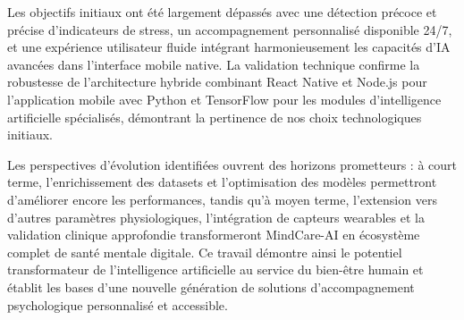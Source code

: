 Les objectifs initiaux ont été largement dépassés avec une détection précoce et précise d'indicateurs de stress, un accompagnement personnalisé disponible 24/7, et une expérience utilisateur fluide intégrant harmonieusement les capacités d'IA avancées dans l'interface mobile native. La validation technique confirme la robustesse de l'architecture hybride combinant React Native et Node.js pour l'application mobile avec Python et TensorFlow pour les modules d'intelligence artificielle spécialisés, démontrant la pertinence de nos choix technologiques initiaux.

Les perspectives d'évolution identifiées ouvrent des horizons prometteurs : à court terme, l'enrichissement des datasets et l'optimisation des modèles permettront d'améliorer encore les performances, tandis qu'à moyen terme, l'extension vers d'autres paramètres physiologiques, l'intégration de capteurs wearables et la validation clinique approfondie transformeront MindCare-AI en écosystème complet de santé mentale digitale. Ce travail démontre ainsi le potentiel transformateur de l'intelligence artificielle au service du bien-être humain et établit les bases d'une nouvelle génération de solutions d'accompagnement psychologique personnalisé et accessible.
